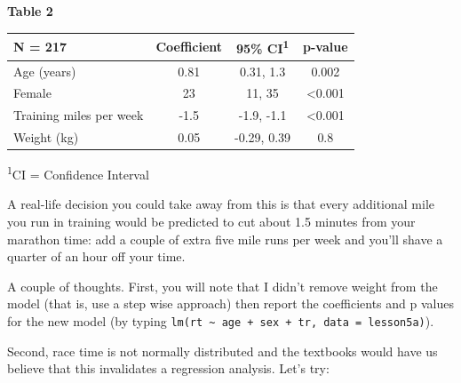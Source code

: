 \documentclass[]{book}
\newenvironment{Shaded}{\begin{snugshade}}{\end{snugshade}}
\newcommand{\DataTypeTok}[1]{\textcolor[rgb]{0.13,0.29,0.53}{#1}}
\newcommand{\KeywordTok}[1]{\textcolor[rgb]{0.13,0.29,0.53}{\textbf{#1}}}
\newcommand{\NormalTok}[1]{#1}
\newcommand{\OperatorTok}[1]{\textcolor[rgb]{0.81,0.36,0.00}{\textbf{#1}}}
\newcommand{\StringTok}[1]{\textcolor[rgb]{0.31,0.60,0.02}{#1}}
\begin{document}
\textbf{Table 2}

\captionsetup[table]{labelformat=empty,skip=1pt}
\begin{longtable}{lccc}
\toprule
\textbf{N = 217} & \textbf{Coefficient} & \textbf{95\% CI}\textsuperscript{1} & \textbf{p-value} \\ 
\midrule
Age (years) & 0.81 & 0.31, 1.3 & 0.002 \\ 
Female & 23 & 11, 35 & <0.001 \\ 
Training miles per week & -1.5 & -1.9, -1.1 & <0.001 \\ 
Weight (kg) & 0.05 & -0.29, 0.39 & 0.8 \\ 
\bottomrule
\end{longtable}
\vspace{-5mm}
\begin{minipage}{\linewidth}
\textsuperscript{1}CI = Confidence Interval \\ 
\end{minipage}

A real-life decision you could take away from this is that every
additional mile you run in training would be predicted to cut about 1.5
minutes from your marathon time: add a couple of extra five mile runs
per week and you'll shave a quarter of an hour off your time.

A couple of thoughts. First, you will note that I didn't remove weight
from the model (that is, use a step wise approach) then report the
coefficients and p values for the new model (by typing
\texttt{lm(rt\ \textasciitilde{}\ age\ +\ sex\ +\ tr,\ data\ =\ lesson5a)}).

Second, race time is not normally distributed and the textbooks would
have us believe that this invalidates a regression analysis. Let's try:

\begin{Shaded}
\end{Shaded}
\end{document}
